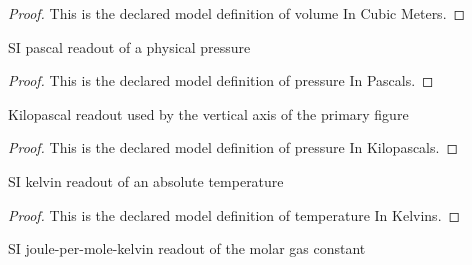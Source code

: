\begin{proof}
  This is the declared model definition of volume In Cubic Meters.
\end{proof}
\begin{definition}
  \label{def:physics:phyx-mini-0369:phyxminiproblems-problemphyxmini0369-pressureinpascals}
  SI pascal readout of a physical pressure
\end{definition}
\begin{proof}
  This is the declared model definition of pressure In Pascals.
\end{proof}
\begin{definition}
  \label{def:physics:phyx-mini-0369:phyxminiproblems-problemphyxmini0369-pressureinkilopascals}
  Kilopascal readout used by the vertical axis of the primary figure
\end{definition}
\begin{proof}
  This is the declared model definition of pressure In Kilopascals.
\end{proof}
\begin{definition}
  \label{def:physics:phyx-mini-0369:phyxminiproblems-problemphyxmini0369-temperatureinkelvins}
  SI kelvin readout of an absolute temperature
\end{definition}
\begin{proof}
  This is the declared model definition of temperature In Kelvins.
\end{proof}
\begin{definition}
  \label{def:physics:phyx-mini-0369:phyxminiproblems-problemphyxmini0369-molargasconstantinjoulespermolekelvin}
  SI joule-per-mole-kelvin readout of the molar gas constant
\end{definition}
